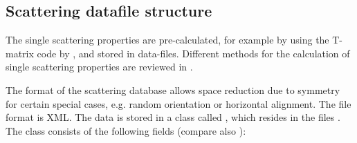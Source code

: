 \subsection{Scattering datafile structure}
\label{sec:clouds:ARTS_SSP_structure}
 
The single scattering properties are pre-calculated, for example by
using the T-matrix 
code by \citet{Mishchenko:02}, and stored in data-files. Different
methods for the calculation of single scattering properties are
reviewed in \citet{emde05:_phdthesis}. 

The format of the scattering database allows space reduction due to
symmetry for certain special cases, e.g. random orientation or
horizontal alignment. The file format is XML. The data is stored in a
class called , which resides in
the files . The class consists of the
following 
fields (compare also ):

